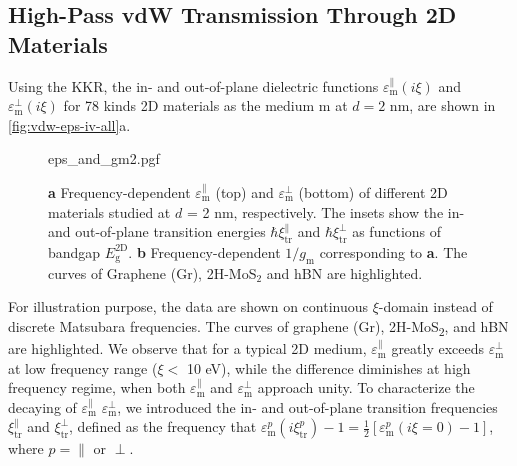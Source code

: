 \subsection{High-Pass vdW Transmission Through 2D Materials}
\label{sec:vdw-high-pass-vdw}


%
Using the KKR, the in- and out-of-plane dielectric functions
$\varepsilon_{\mathrm{m}}^{\parallel}(i \xi)$ and
$\varepsilon_{\mathrm{m}}^{\perp}(i \xi)$ for 78 kinds 2D
materials as the medium m at $d=2$ nm, are
shown in \autoref{fig:vdw-eps-iv-all}a.
%

\begin{figure}[!htbp]
  \centering
  {eps_and_gm2.pgf}
  \caption{\label{fig:vdw-eps-iv-all} %
    {\bfseries a} Frequency-dependent
    $\varepsilon_{\mathrm{m}}^{\parallel}$ (top) and
    $\varepsilon_{\mathrm{m}}^{\perp}$ (bottom) of different 2D
    materials studied at $d$ = 2 nm, respectively. The insets show the
    in- and out-of-plane transition energies
    $\hbar \xi_{\mathrm{tr}}^{\parallel}$ and
    $\hbar \xi_{\mathrm{tr}}^{\perp}$ as functions of bandgap
    $E_{\mathrm{g}}^{\mathrm{2D}}$. {\bfseries b} Frequency-dependent
    $1/g_{\mathrm{m}}$ corresponding to {\bfseries a}. The curves
    of Graphene (Gr), 2H-MoS$_{2}$ and hBN are highlighted. %
  }
\end{figure}
For illustration purpose, the data are shown on continuous
$\xi$-domain instead of discrete Matsubara frequencies.
%
The
curves of graphene (Gr), 2H-MoS\textsubscript{2}, and hBN are
highlighted.
%
We observe that for a typical 2D medium,
\(\varepsilon_{\mathrm{m}}^{\parallel}\) greatly exceeds
\(\varepsilon_{\mathrm{m}}^{\perp}\) at low frequency range ($\xi <$
10 eV), while the difference diminishes at high frequency regime, when
both $\varepsilon_{\mathrm{m}}^{\parallel}$ and
$\varepsilon_{\mathrm{m}}^{\perp}$ approach unity.
%
To characterize the decaying of $\varepsilon_{\mathrm{m}}^{\parallel}$ $\varepsilon_{\mathrm{m}}^{\perp}$, we introduced the in- and
out-of-plane transition frequencies \(\xi_{\mathrm{tr}}^{\parallel}\)
and \(\xi_{\mathrm{tr}}^{\perp}\), defined as the frequency that
\(\varepsilon_{\mathrm{m}}^{p}(i \xi^{p}_{\mathrm{tr}}) - 1 =
\frac{1}{2}[\varepsilon_{\mathrm{m}}^{p}(i\xi=0) - 1]\), where
$p=\parallel$ or $\perp$.
%

